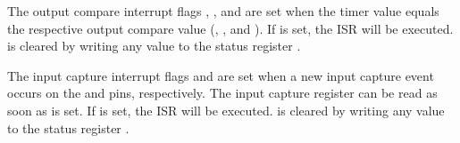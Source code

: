 The output compare interrupt flags , , and  are set when the timer value equals the respective output compare value (, , and ). If  is set, the  ISR will be executed.  is cleared by writing any value to the status register .

The input capture interrupt flags  and  are set when a new input capture event occurs on the  and  pins, respectively. The input capture register  can be read as soon as  is set. If  is set, the  ISR will be executed.  is cleared by writing any value to the status register .
